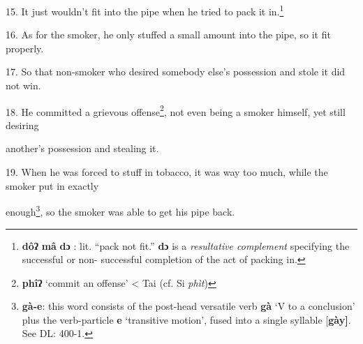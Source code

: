 15. It just wouldn't fit into the pipe when he tried to pack it in.\footnote{\textbf{dôʔ} \textbf{mâ} \textbf{dɔ} : lit. ``pack not fit.'' \textbf{dɔ} is a \textit{resultative complement} specifying the successful or non- successful completion of the act of packing in.}

16. As for the smoker, he only stuffed a small amount into the pipe, so it fit
properly.

17. So that non-smoker who desired somebody else's possession and stole it did
not win.

18. He committed a grievous offense\footnote{\textbf{phîʔ} `commit an offense' < Tai (cf. Si \textit{phìt})}, not even being a smoker himself, yet still
desiring

another's possession and stealing it.

19. When he was forced to stuff in tobacco, it was way too much, while the smoker
put in exactly

enough\footnote{\textbf{gà-e}: this word consists of the post-head versatile verb \textbf{gà} `V to a conclusion' plus the verb-particle \textbf{e} `transitive motion', fused into a single syllable [\textbf{gày]}. See DL: 400-1.}, so the smoker was able to get his pipe back.

